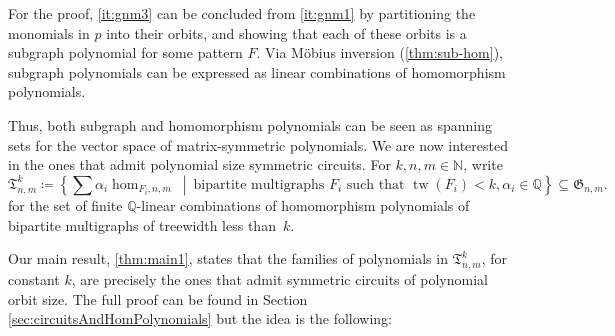\documentclass[10pt,a4paper]{article}
\theoremstyle{definition}
\theoremstyle{plain}
\theoremstyle{remark}
\DeclareMathOperator{\tw}{tw}
\begin{document}
For the proof,  \cref{it:gnm3} can be concluded from \cref{it:gnm1} by partitioning the monomials in $p$ into their orbits, and showing that each of these orbits is a subgraph polynomial for some pattern $F$. Via Möbius inversion (\cref{thm:sub-hom}), subgraph polynomials can be expressed as linear combinations of homomorphism polynomials.

Thus, both subgraph and homomorphism polynomials can be seen as spanning sets for the vector space of matrix-symmetric polynomials. 
We are now interested in the ones that admit polynomial size symmetric circuits.
For $k,n,m \in \mathbb{N}$, write
\[
\mathfrak{T}_{n,m}^k \coloneqq \left\{\sum \alpha_i \hom_{F_i, n,m} \ \middle|\  \text{bipartite multigraphs } F_i \text{ such that } \tw(F_i) < k, \alpha_i \in \mathbb{Q} \right\} \subseteq \mathfrak{G}_{n,m}.
\]
for the set of finite $\mathbb{Q}$-linear combinations of homomorphism polynomials of bipartite multigraphs of treewidth less than~$k$.

Our main result, \cref{thm:main1}, states that the families of polynomials in $\mathfrak{T}_{n,m}^k$, for constant $k$, are precisely the ones that admit symmetric circuits of polynomial orbit size. The full proof can be found in Section \ref{sec:circuitsAndHomPolynomials} but the idea is the following: 
\end{document}
